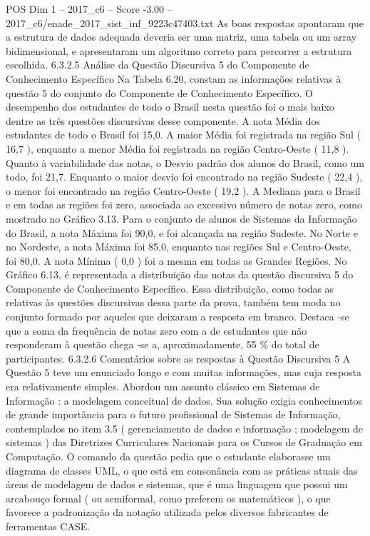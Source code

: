 \begin{textsample}{POS Dim 1 – 2017\_c6 – Score -3.00 – 2017\_c6/enade\_2017\_sist\_inf\_9223c47403.txt}
As boas respostas apontaram que a estrutura de dados adequada deveria ser uma matriz, uma tabela ou um array bidimensional, e apresentaram um algoritmo correto para percorrer a estrutura escolhida. 6.3.2.5 Análise da Questão Discursiva 5 do Componente de Conhecimento Específico Na Tabela 6.20, constam as informações relativas à questão 5 do conjunto do Componente de Conhecimento Específico.
O desempenho dos estudantes de todo o Brasil nesta questão foi o mais baixo dentre as três questões discursivas desse componente.
A nota Média dos estudantes de todo o Brasil foi 15,0.
A maior Média foi registrada na região Sul ( 16,7 ), enquanto a menor Média foi registrada na região Centro-Oeste ( 11,8 ).
Quanto à variabilidade das notas, o Desvio padrão dos alunos do Brasil, como um todo, foi 21,7.
Enquanto o maior desvio foi encontrado na região Sudeste ( 22,4 ), o menor foi encontrado na região Centro-Oeste ( 19,2 ).
A Mediana para o Brasil e em todas as regiões foi zero, associada ao excessivo número de notas zero, como mostrado no Gráfico 3.13.
Para o conjunto de alunos de Sistemas da Informação do Brasil, a nota Máxima foi 90,0, e foi alcançada na região Sudeste.
No Norte e no Nordeste, a nota Máxima foi 85,0, enquanto nas regiões Sul e Centro-Oeste, foi 80,0.
A nota Mínima ( 0,0 ) foi a mesma em todas as Grandes Regiões.
No Gráfico 6.13, é representada a distribuição das notas da questão discursiva 5 do Componente de Conhecimento Específico.
Essa distribuição, como todas as relativas às questões discursivas dessa parte da prova, também tem moda no conjunto formado por aqueles que deixaram a resposta em branco.
Destaca -se que a soma da frequência de notas zero com a de estudantes que não responderam à questão chega -se a, aproximadamente, 55 \% do total de participantes. 6.3.2.6 Comentários sobre as respostas à Questão Discursiva 5 A Questão 5 teve um enunciado longo e com muitas informações, mas cuja resposta era relativamente simples.
Abordou um assunto clássico em Sistemas de Informação : a modelagem conceitual de dados.
Sua solução exigia conhecimentos de grande importância para o futuro profissional de Sistemas de Informação, contemplados no item 3.5 ( gerenciamento de dados e informação ; modelagem de sistemas ) das Diretrizes Curriculares Nacionais para os Cursos de Graduação em Computação.
O comando da questão pedia que o estudante elaborasse um diagrama de classes UML, o que está em consonância com as práticas atuais das áreas de modelagem de dados e sistemas, que é uma linguagem que possui um arcabouço formal ( ou semiformal, como preferem os matemáticos ), o que favorece a padronização da notação utilizada pelos diversos fabricantes de ferramentas CASE.

\end{textsample}
